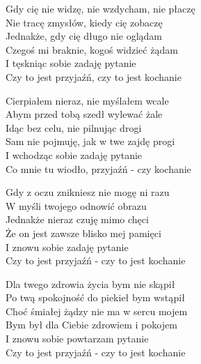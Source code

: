 \begin{textn}
    Gdy cię nie widzę, nie wzdycham, nie płaczę\\
    Nie tracę zmysłów, kiedy cię zobaczę\\
    Jednakże, gdy cię długo nie oglądam\\
    Czegoś mi braknie, kogoś widzieć żądam\\
    I tęskniąc sobie zadaję pytanie\\
    Czy to jest przyjaźń, czy to jest kochanie

    Cierpiałem nieraz, nie myślałem wcale\\
    Abym przed tobą szedł wylewać żale\\
    Idąc bez celu, nie pilnując drogi\\
    Sam nie pojmuję, jak w twe zajdę progi\\
    I wchodząc sobie zadaję pytanie\\
    Co mnie tu wiodło, przyjaźń - czy kochanie

    Gdy z oczu znikniesz nie mogę ni razu\\
    W myśli twojego odnowić obrazu\\
    Jednakże nieraz czuję mimo chęci\\
    Że on jest zawsze blisko mej pamięci\\
    I znowu sobie zadaję pytanie\\
    Czy to jest przyjaźń - czy to jest kochanie

    Dla twego zdrowia życia bym nie skąpił\\
    Po twą spokojność do piekieł bym wstąpił\\
    Choć śmiałej żądzy nie ma w sercu mojem\\
    Bym był dla Ciebie zdrowiem i pokojem\\
    I znowu sobie powtarzam pytanie\\
    Czy to jest przyjaźń - czy to jest kochanie
\end{textn}

